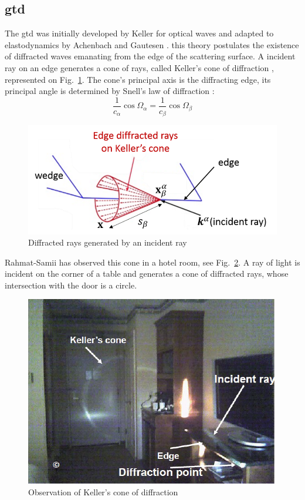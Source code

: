 \subsection{\acrfull{gtd}}
The \acrfull{gtd} was initially developed by Keller \cite{GTD} for optical waves and adapted to elastodynamics by Achenbach and Gautesen \cite{AchenbachGautesen, Achenbach}. this theory postulates the existence of diffracted waves emanating from the edge of the scattering surface. A incident ray on an edge generates a cone of rays, called Keller's cone of diffraction \cite{GTD}, represented on Fig.~\ref{KellerCone}. The cone's principal axis is the diffracting edge, its principal angle is determined by Snell's law of diffraction :
\begin{equation}
    \frac{1}{c_{\alpha}}\cos\Omega_{\alpha} = \frac{1}{c_{\beta}} \cos\Omega_{\beta}
\end{equation}

\begin{figure}
    \centering
    \includegraphics[width=\textwidth]{images/chapter1/KellerCone.png}
    \caption{Diffracted rays generated by an incident ray}
    \label{KellerCone}
\end{figure}

Rahmat-Samii \cite{ConePhoto} has observed this cone in a hotel room, see Fig.~\ref{PhotoCone}. A ray of light is incident on the corner of a table and generates a cone of diffracted rays, whose intersection with the door is a circle.

\begin{figure}
    \centering
    \includegraphics{images/chapter1/HotelCone.png}
    \caption{Observation of Keller's cone of diffraction}
    \label{PhotoCone}
\end{figure}

